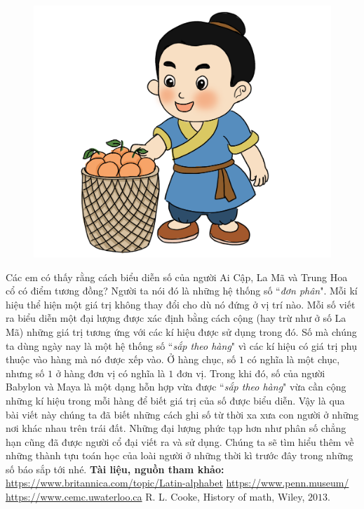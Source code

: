 \begin{multicols}{2}
\begin{figure}[H]
		\centering
		\vspace*{-5pt}
		\captionsetup{labelformat= empty, justification=centering}
		\includegraphics[width=0.85\linewidth]{20.12-pi.3}
		\vspace*{-15pt}
	\end{figure}
	Các em có thấy rằng cách biểu diễn số của người Ai Cập, La Mã và Trung Hoa cổ có điểm tương đồng? Người ta nói đó là những hệ thống số ``\textit{đơn phân}". Mỗi kí hiệu thể hiện một giá trị không thay đổi cho dù nó đứng ở vị trí nào. Mỗi số viết ra biểu diễn một đại lượng được xác định bằng cách  cộng (hay trừ như ở số La Mã) những giá trị tương ứng với các kí hiệu được sử dụng trong đó. Số mà chúng ta dùng ngày nay là một hệ thống số ``\textit{sắp theo hàng}" vì các kí hiệu có giá trị phụ thuộc vào hàng mà nó được xếp vào. Ở hàng chục, số $1$ có nghĩa là một chục, nhưng số $1$ ở hàng đơn vị có nghĩa là $1$ đơn vị. Trong khi đó, số của người Babylon và Maya là một dạng hỗn hợp vừa được ``\textit{sắp theo hàng}" vừa cần cộng những kí hiệu trong mỗi hàng để biết giá trị của số được biểu diễn.
	\vskip 0.1cm
	Vậy là qua bài viết này chúng ta đã biết những cách ghi số  từ thời xa xưa con người ở những nơi khác nhau trên trái đất. Những đại lượng phức tạp hơn như phân số chẳng hạn cũng đã được người cổ đại viết ra và sử dụng. Chúng ta sẽ tìm hiểu thêm về những thành tựu toán học của loài người ở những thời kì trước đây trong những số báo sắp tới nhé. 
	\vskip 0.1cm
	\textbf{Tài liệu, nguồn tham khảo:}
	\vskip 0.1cm
	\url{https://www.britannica.com/topic/Latin-alphabet}
	\vskip 0.1cm
	\url{https://www.penn.museum/}
	\vskip 0.1cm
	\url{https://www.cemc.uwaterloo.ca}
	\vskip 0.1cm
	R. L. Cooke, History of math, Wiley, $2013$.
\end{multicols}